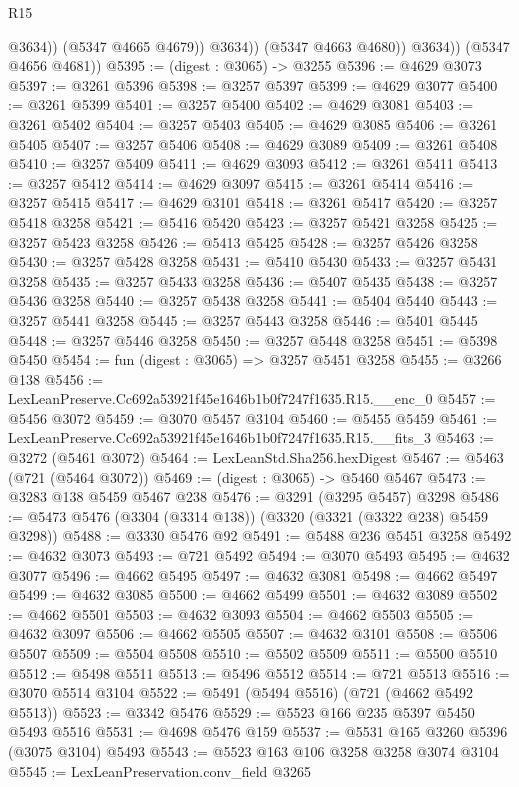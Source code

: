 \begin{lexlean}{R15}
\begin{coremodule}
                      @3634))
                  (@5347 @4665 @4679))
                @3634))
            (@5347 @4663 @4680))
          @3634))
      (@5347 @4656 @4681))
@5395 := (digest : @3065) -> @3255
@5396 := @4629 @3073
@5397 := @3261 @5396
@5398 := @3257 @5397
@5399 := @4629 @3077
@5400 := @3261 @5399
@5401 := @3257 @5400
@5402 := @4629 @3081
@5403 := @3261 @5402
@5404 := @3257 @5403
@5405 := @4629 @3085
@5406 := @3261 @5405
@5407 := @3257 @5406
@5408 := @4629 @3089
@5409 := @3261 @5408
@5410 := @3257 @5409
@5411 := @4629 @3093
@5412 := @3261 @5411
@5413 := @3257 @5412
@5414 := @4629 @3097
@5415 := @3261 @5414
@5416 := @3257 @5415
@5417 := @4629 @3101
@5418 := @3261 @5417
@5420 := @3257 @5418 @3258
@5421 := @5416 @5420
@5423 := @3257 @5421 @3258
@5425 := @3257 @5423 @3258
@5426 := @5413 @5425
@5428 := @3257 @5426 @3258
@5430 := @3257 @5428 @3258
@5431 := @5410 @5430
@5433 := @3257 @5431 @3258
@5435 := @3257 @5433 @3258
@5436 := @5407 @5435
@5438 := @3257 @5436 @3258
@5440 := @3257 @5438 @3258
@5441 := @5404 @5440
@5443 := @3257 @5441 @3258
@5445 := @3257 @5443 @3258
@5446 := @5401 @5445
@5448 := @3257 @5446 @3258
@5450 := @3257 @5448 @3258
@5451 := @5398 @5450
@5454 := fun (digest : @3065) => @3257 @5451 @3258
@5455 := @3266 @138
@5456 := LexLeanPreserve.Cc692a53921f45e1646b1b0f7247f1635.R15.__enc_0
@5457 := @5456 @3072
@5459 := @3070 @5457 @3104
@5460 := @5455 @5459
@5461 := LexLeanPreserve.Cc692a53921f45e1646b1b0f7247f1635.R15.__fits_3
@5463 := @3272 (@5461 @3072)
@5464 := LexLeanStd.Sha256.hexDigest
@5467 := @5463 (@721 (@5464 @3072))
@5469 := (digest : @3065) -> @5460 @5467
@5473 := @3283 @138 @5459 @5467 @238
@5476 := @3291 (@3295 @5457) @3298
@5486 := @5473 @5476 (@3304 (@3314 @138)) (@3320 (@3321 (@3322 @238) @5459 @3298))
@5488 := @3330 @5476 @92
@5491 := @5488 @236 @5451 @3258
@5492 := @4632 @3073
@5493 := @721 @5492
@5494 := @3070 @5493
@5495 := @4632 @3077
@5496 := @4662 @5495
@5497 := @4632 @3081
@5498 := @4662 @5497
@5499 := @4632 @3085
@5500 := @4662 @5499
@5501 := @4632 @3089
@5502 := @4662 @5501
@5503 := @4632 @3093
@5504 := @4662 @5503
@5505 := @4632 @3097
@5506 := @4662 @5505
@5507 := @4632 @3101
@5508 := @5506 @5507
@5509 := @5504 @5508
@5510 := @5502 @5509
@5511 := @5500 @5510
@5512 := @5498 @5511
@5513 := @5496 @5512
@5514 := @721 @5513
@5516 := @3070 @5514 @3104
@5522 := @5491 (@5494 @5516) (@721 (@4662 @5492 @5513))
@5523 := @3342 @5476
@5529 := @5523 @166 @235 @5397 @5450 @5493 @5516
@5531 := @4698 @5476 @159
@5537 := @5531 @165 @3260 @5396 (@3075 @3104) @5493
@5543 := @5523 @163 @106 @3258 @3258 @3074 @3104
@5545 := LexLeanPreservation.conv_field @3265

\end{coremodule}
\end{lexlean}
